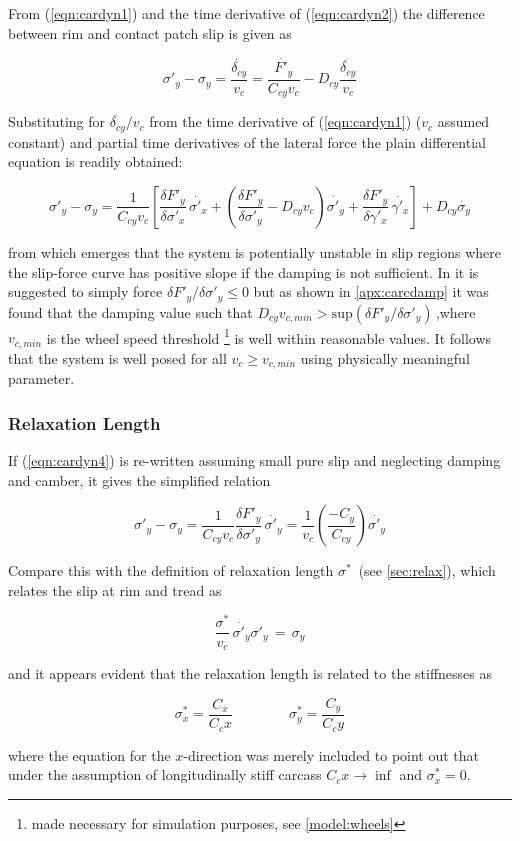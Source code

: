 \documentclass[12pt,a4paper]{report}
\newcommand{\eq}[2]{
\begin{equation} \label{#1}
#2
\end{equation}
}
\newcommand{\req}[1]{
(\ref{#1})
}
\newcommand{\dif}[2]{
\frac{\delta#1}{\delta#2} 
}
\newcommand{\difp}[2]{
\frac{\delta#1}{\delta#2} \, \dot{#2} 
}
\begin{document}
From \req{eqn:cardyn1} and the time derivative of \req{eqn:cardyn2} the difference between rim and contact patch slip is given as

\eq{cardyn3}{\sigma'_y - \sigma_y = \frac{\dot{\delta_{cy}}}{v_c} = \frac{\dot{F'_y}}{C_{cy}v_c} - D_{cy}\frac{\ddot{\delta_{cy}}}{v_c}}

Substituting for $\ddot{\delta_{cy}} / v_c $ from the time derivative of \req{eqn:cardyn1} ($v_c$ assumed constant) and partial time derivatives of the lateral force the plain differential equation is readily obtained:

\eq{eqn:cardyn4}{\sigma'_y - \sigma_y =
	\frac{1}{C_{cy}v_c} \left[\difp{F'_y}{\sigma'_x} + \left(\dif{F'_y}{\sigma'_y}-D_{cy}v_c\right)\dot{\sigma'_y} + \difp{F'_y}{\gamma'_x}\right] 
	+ D_{cy}\dot{\sigma_y}}

from which emerges that the system is potentially unstable in slip regions where the slip-force curve has positive slope if the damping is not sufficient. In \citep{pacejka02} it is suggested to simply force $\delta F'_y / \delta \sigma'_y \leq 0$ but as shown in \ref{apx:carcdamp} it was found that the damping value such that $D_{cy}v_{c,min} > \mathrm{sup}(\delta F'_y / \delta \sigma'_y)\,$,where $v_{c,min}$ is the wheel speed threshold \footnote{made necessary for simulation purposes, see \ref{model:wheels}} is well within reasonable values.
It follows that the system is well posed for all $v_c \geq v_{c,min}$ using physically meaningful parameter. %

\subsubsection*{Relaxation Length} \label{introrelax}
If \req{eqn:cardyn4} is re-written assuming small pure slip and neglecting damping and camber, it gives the simplified relation
\eq{eqn:cardyn4simp}{\sigma'_y - \sigma_y = \frac{1}{C_{cy} v_c} \difp{F'_y}{\sigma'_y} = 
											\frac{1}{v_c} \left(\frac{-C_y}{C_{cy}}\right) \dot{\sigma'_y}}

Compare this with the definition of relaxation length $\sigma^* \,$ (see \ref{sec:relax}), which relates the slip at rim and tread as
\eq{eqn:cardyn5}{\frac{\sigma^*}{v_c} \, \dot{\sigma'_y} \sigma'_y \, = \, \sigma_y }
and it appears evident that the relaxation length is related to the stiffnesses as
\eq{eqn:cardyn6}{\sigma^*_x = \frac{C_x}{C_cx} \qquad \qquad \sigma^*_y = \frac{C_y}{C_cy}}
where the equation for the $x$-direction was merely included to point out that under the assumption of longitudinally stiff carcass $C_cx \rightarrow \inf$ and $\sigma^*_x = 0$.
\end{document}
